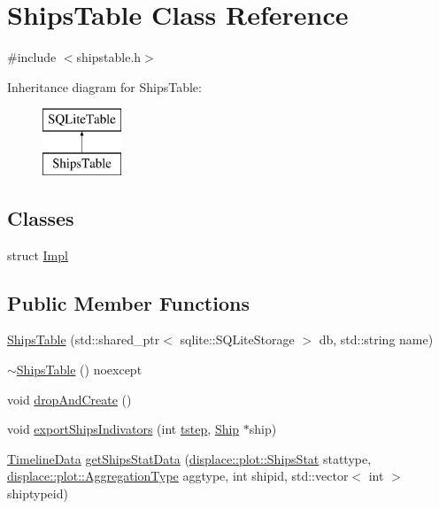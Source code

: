 \hypertarget{class_ships_table}{}\section{Ships\+Table Class Reference}
\label{class_ships_table}


{\ttfamily \#include $<$shipstable.\+h$>$}

Inheritance diagram for Ships\+Table\+:\begin{figure}[H]
\begin{center}
\leavevmode
\includegraphics[height=2.000000cm]{d1/d9f/class_ships_table}
\end{center}
\end{figure}
\subsection*{Classes}
\begin{DoxyCompactItemize}
\item 
struct \mbox{\hyperlink{struct_ships_table_1_1_impl}{Impl}}
\end{DoxyCompactItemize}
\subsection*{Public Member Functions}
\begin{DoxyCompactItemize}
\item 
\mbox{\hyperlink{class_ships_table_a3517ea91749252e3f28e1125d9e8a63a}{Ships\+Table}} (std\+::shared\+\_\+ptr$<$ sqlite\+::\+S\+Q\+Lite\+Storage $>$ db, std\+::string name)
\item 
\mbox{\hyperlink{class_ships_table_a6e09c3aa5ce197a0f094a1908987b108}{$\sim$\+Ships\+Table}} () noexcept
\item 
void \mbox{\hyperlink{class_ships_table_a55bcab80359ce688ac530fb419965de3}{drop\+And\+Create}} ()
\item 
void \mbox{\hyperlink{class_ships_table_acb6781e8fa1d587c6a79f08b63d2194f}{export\+Ships\+Indivators}} (int \mbox{\hyperlink{thread__vessels_8cpp_a84bc73d278de929ec9974e1a95d9b23a}{tstep}}, \mbox{\hyperlink{class_ship}{Ship}} $\ast$ship)
\item 
\mbox{\hyperlink{struct_timeline_data}{Timeline\+Data}} \mbox{\hyperlink{class_ships_table_a0d1779e92f564cd50581e1222a04c1a2}{get\+Ships\+Stat\+Data}} (\mbox{\hyperlink{namespacedisplace_1_1plot_a8c50b4d54cafba744b1b5b51b53407e0}{displace\+::plot\+::\+Ships\+Stat}} stattype, \mbox{\hyperlink{namespacedisplace_1_1plot_a522cdc3da3faefae0803944b866e0c3d}{displace\+::plot\+::\+Aggregation\+Type}} aggtype, int shipid, std\+::vector$<$ int $>$ shiptypeid)
\end{DoxyCompactItemize}


